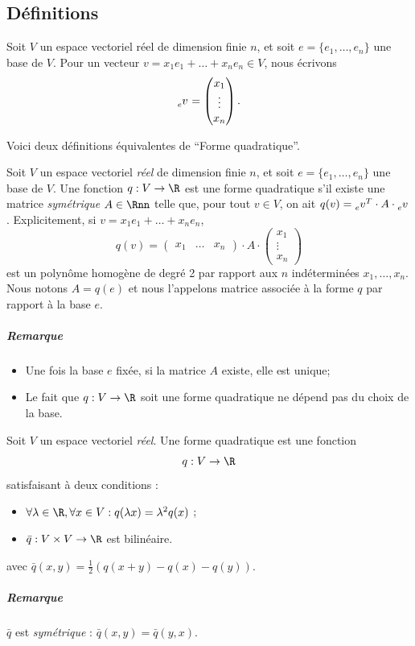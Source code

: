 \subsection{Définitions}

\begin{mynota}
	Soit $V$ un espace vectoriel réel de dimension finie $n$,
	et soit $e = \{e_1, \dots, e_n\}$ une base de $V$.
	Pour un vecteur $v = x_1e_1 + \dots + x_ne_n \in V$, nous écrivons
	\[ \tensor[_e]{v}{} = \begin{pmatrix}x_1\\\vdots\\x_n\end{pmatrix}. \]
\end{mynota}

Voici deux définitions équivalentes de ``Forme quadratique''.

\begin{mydef}
	Soit $V$ un espace vectoriel \emph{réel} de dimension finie $n$,
	et soit $e = \{e_1, \dots, e_n\}$ une base de $V$.
	Une fonction $q: V \to \R$ est une forme quadratique s'il existe
	une matrice \emph{symétrique} $A \in \Rnn$ telle que, pour tout $v \in V$,
	on ait $q(v) = \tensor[_e]{v}{^T} \cdot A \cdot \tensor[_e]{v}{}$.
	Explicitement, si $v = x_1e_1 + \dots + x_ne_n$,
	\[ q(v) = \begin{pmatrix}x_1 & \dots & x_n\end{pmatrix} \cdot A \cdot \begin{pmatrix}x_1\\\vdots\\x_n\end{pmatrix} \]
	est un polynôme homogène de degré 2 par rapport aux $n$ indéterminées $x_1, \dots, x_n$.
	Nous notons $A = q(e)$ et nous l'appelons matrice associée à la forme $q$ par rapport à la base $e$.
	\subparagraph{Remarque}
	\begin{itemize}
		\item Une fois la base $e$ fixée, si la matrice $A$ existe, elle est unique;
		\item Le fait que $q: V \to \R$ soit une forme quadratique ne dépend pas du choix de la base.
	\end{itemize}
\end{mydef}

\begin{mydef}
	Soit $V$ un espace vectoriel \emph{réel}.
	Une forme quadratique est une fonction
	\[ q : V \rightarrow \R \]
	satisfaisant à deux conditions :
	\begin{itemize}
		\item $\forall \lambda \in \R, \forall x \in V : q(\lambda x) = \lambda^2 q(x)$ ;
		\item $\bar{q} : V \times V \rightarrow \R$ est bilinéaire.
	\end{itemize}
	avec $\bar{q}(x,y) = \frac 12 (q(x+y) - q(x) - q(y) )$.
	\subparagraph{Remarque}
	$\bar{q}$ est \emph{symétrique} : $\bar{q}(x,y) = \bar{q}(y,x)$.
\end{mydef}

